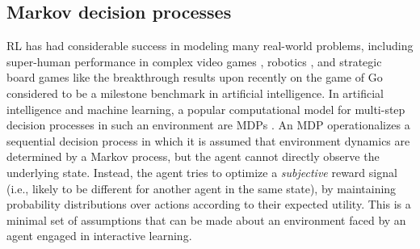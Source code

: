 \documentclass[10pt,letterpaper]{article}
\begin{document}
\subsection{Markov decision processes}
RL has had considerable success in modeling many real-world problems, including super-human performance in complex video games \citep{mnih2015},
robotics \citep{ng2004,abbeel2004},
and strategic board games like the breakthrough results upon recently on the game of Go \citep{silver2016mastering} considered to be a milestone benchmark in artificial intelligence.
In artificial intelligence and machine learning, a popular computational model for
multi-step decision processes in such an environment are
MDPs \citep{sutton1998reinforcement}.
An MDP operationalizes a sequential decision process
in which it is assumed that environment dynamics are determined by a Markov process,
but the agent cannot directly observe the underlying state.
Instead, the agent tries to optimize a \textit{subjective} reward
signal (i.e., likely to be different for another agent in the same state),
by maintaining probability distributions over actions according to their expected utility.
This is a minimal set of assumptions that can be made about an environment faced by an agent engaged in interactive learning.
\end{document}
